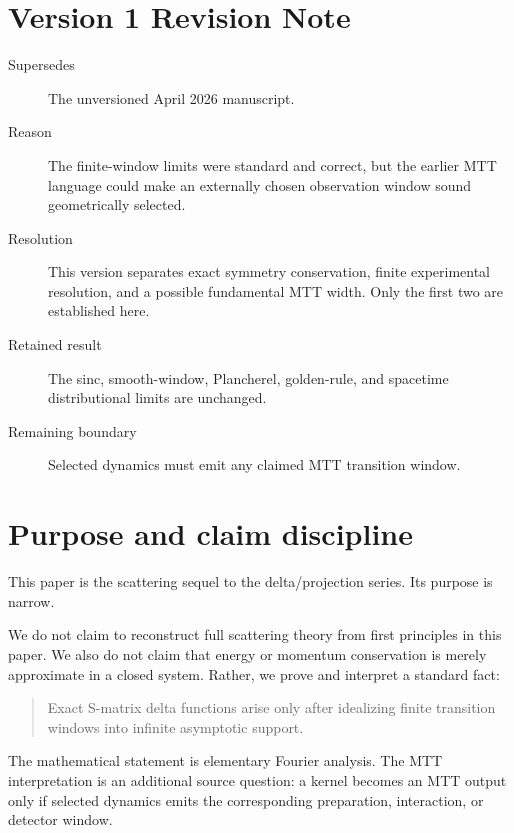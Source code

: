 \documentclass[11pt]{article}
\begin{document}
\section*{Version 1 Revision Note}
\begin{description}
\item[Supersedes] The unversioned April 2026 manuscript.
\item[Reason] The finite-window limits were standard and correct, but the earlier MTT
language could make an externally chosen observation window sound geometrically selected.
\item[Resolution] This version separates exact symmetry conservation, finite experimental
resolution, and a possible fundamental MTT width.  Only the first two are established here.
\item[Retained result] The sinc, smooth-window, Plancherel, golden-rule, and spacetime
distributional limits are unchanged.
\item[Remaining boundary] Selected dynamics must emit any claimed MTT transition window.
\end{description}

\tableofcontents

\section{Purpose and claim discipline}

This paper is the scattering sequel to the delta/projection series.  Its purpose is narrow.

We do not claim to reconstruct full scattering theory from first principles in this paper.  We also do not claim that energy or momentum conservation is merely approximate in a closed system.  Rather, we prove and interpret a standard fact:

\begin{quote}
Exact S-matrix delta functions arise only after idealizing finite transition windows into infinite asymptotic support.
\end{quote}

The mathematical statement is elementary Fourier analysis.  The MTT interpretation is an
additional source question: a kernel becomes an MTT output only if selected dynamics emits
the corresponding preparation, interaction, or detector window.

\begin{center}
\end{center}
\end{document}
